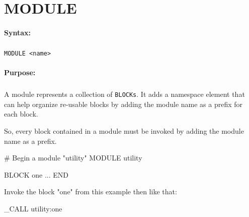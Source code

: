 
\newpage
\section{MODULE}
\label{cmd:MODULE}

\paragraph{Syntax:}
\subparagraph{}
\texttt{MODULE <name>}

\paragraph{Purpose:}
\subparagraph{}
A module represents a collection of \texttt{BLOCKs}. It adds a namespace 
element that can help organize re-usable blocks by adding the module 
name as a prefix for each block.

So, every block contained in a module must be invoked by adding the 
module name as a prefix.

\begin{usplisting}
    # Begin a module "utility"
    MODULE utility

    BLOCK one
    ...
    END
\end{usplisting}

Invoke the block "one" from this example then like that:

\begin{usplisting}
    _CALL utility:one
\end{usplisting}
